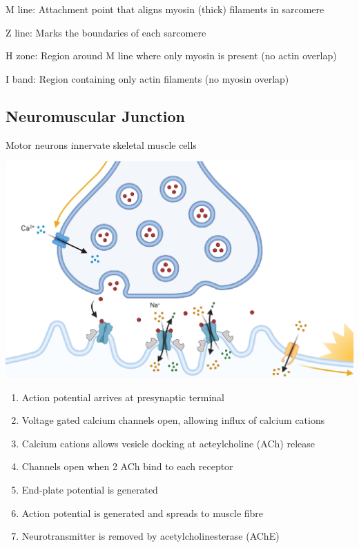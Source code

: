 \documentclass[11pt,fleqn]{book} %
\begin{document}
\begin{descriptions}
    \item[M line: ]Attachment point that aligns myosin (thick)
filaments in sarcomere 
    \item[Z line: ]Marks the boundaries of each sarcomere 
    \item[H zone: ]Region around M line where only myosin is
present (no actin overlap)
    \item[I band: ]Region containing only actin filaments (no
myosin overlap)
\end{descriptions}

\subsection{Neuromuscular Junction}
\begin{remark}
    Motor neurons innervate skeletal muscle cells
\end{remark}
\begin{center}
    \includegraphics[width=0.65\linewidth]{Pictures/Screenshot 2024-04-03 005847.png}
\end{center}
\begin{enumerate}
    \item Action potential arrives at presynaptic terminal
    \item Voltage gated calcium channels open, allowing influx of calcium cations
    \item Calcium cations allows vesicle docking at acteylcholine (ACh) release
    \item Channels open when 2 ACh bind to each receptor
    \item End-plate potential is generated
    \item Action potential is generated and spreads to muscle fibre
    \item Neurotransmitter is removed by acetylcholinesterase (AChE)
\end{enumerate}
\end{document}
